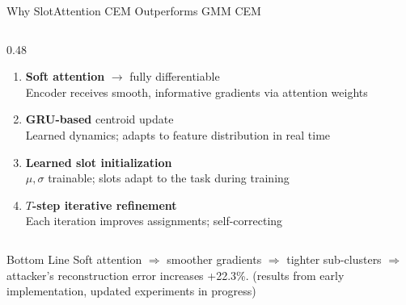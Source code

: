 \documentclass[aspectratio=169, 10pt]{beamer}
\newcommand{\good}[1]{\textcolor{goodgreen}{#1}}
\begin{document}
\begin{frame}{Why SlotAttention CEM Outperforms GMM CEM}
\begin{columns}[T]
\begin{column}{0.48\textwidth}
\vspace{0.05cm}
\small
\begin{enumerate}\setlength{\itemsep}{2pt}
    \item \textbf{Soft attention} $\to$ fully differentiable\\
    Encoder receives \good{smooth, informative} gradients via attention weights
    \item \textbf{GRU-based} centroid update\\
    \good{Learned dynamics}; adapts to feature distribution in real time
    \item \textbf{Learned slot initialization}\\
    $\mu, \sigma$ trainable; slots adapt to the task during training
    \item \textbf{$T$-step iterative refinement}\\
    Each iteration \good{improves} assignments; self-correcting
\end{enumerate}
\end{column}
\end{columns}

\vspace{0.05cm}
\begin{block}{\small Bottom Line}
\small Soft attention $\Rightarrow$ smoother gradients $\Rightarrow$ tighter sub-clusters $\Rightarrow$ attacker's reconstruction error increases \good{+22.3\%}. {\scriptsize\color{warnorg}(results from early implementation, updated experiments in progress)}
\end{block}

\end{frame}
\end{document}

